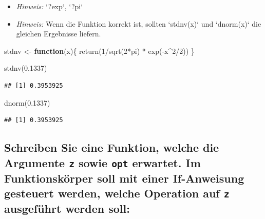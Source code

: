 \documentclass[12pt,a4paper]{article}
\newenvironment{Shaded}{\begin{snugshade}}{\end{snugshade}}
\newcommand{\ControlFlowTok}[1]{\textcolor[rgb]{0.13,0.29,0.53}{\textbf{#1}}}
\newcommand{\DecValTok}[1]{\textcolor[rgb]{0.00,0.00,0.81}{#1}}
\newcommand{\FloatTok}[1]{\textcolor[rgb]{0.00,0.00,0.81}{#1}}
\newcommand{\FunctionTok}[1]{\textcolor[rgb]{0.00,0.00,0.00}{#1}}
\newcommand{\NormalTok}[1]{#1}
\newcommand{\OtherTok}[1]{\textcolor[rgb]{0.56,0.35,0.01}{#1}}
\newcommand{\SpecialCharTok}[1]{\textcolor[rgb]{0.00,0.00,0.00}{#1}}
\begin{document}
\begin{itemize}
  \item \textit{Hinweis:} `?exp`, `?pi`
  \item \textit{Hinweis:} Wenn die Funktion korrekt ist, sollten `stdnv(x)` und `dnorm(x)` die gleichen Ergebnisse liefern.
\end{itemize}

\begin{Shaded}
\begin{Highlighting}[]
\NormalTok{    stdnv }\OtherTok{\textless{}{-}} \ControlFlowTok{function}\NormalTok{(x)\{}
      \FunctionTok{return}\NormalTok{(}\DecValTok{1}\SpecialCharTok{/}\FunctionTok{sqrt}\NormalTok{(}\DecValTok{2}\SpecialCharTok{*}\NormalTok{pi) }\SpecialCharTok{*} \FunctionTok{exp}\NormalTok{(}\SpecialCharTok{{-}}\NormalTok{x}\SpecialCharTok{\^{}}\DecValTok{2}\SpecialCharTok{/}\DecValTok{2}\NormalTok{))}
\NormalTok{    \}}
    
    \FunctionTok{stdnv}\NormalTok{(}\FloatTok{0.1337}\NormalTok{)}
\end{Highlighting}
\end{Shaded}

\begin{verbatim}
## [1] 0.3953925
\end{verbatim}

\begin{Shaded}
\begin{Highlighting}[]
    \FunctionTok{dnorm}\NormalTok{(}\FloatTok{0.1337}\NormalTok{)}
\end{Highlighting}
\end{Shaded}

\begin{verbatim}
## [1] 0.3953925
\end{verbatim}

\hypertarget{schreiben-sie-eine-funktion-welche-die-argumente-z-sowie-opt-erwartet.-im-funktionskuxf6rper-soll-mit-einer-if-anweisung-gesteuert-werden-welche-operation-auf-z-ausgefuxfchrt-werden-soll}{%
\subsection{\texorpdfstring{Schreiben Sie eine Funktion, welche die
Argumente \texttt{z} sowie \texttt{opt} erwartet. Im Funktionskörper
soll mit einer If-Anweisung gesteuert werden, welche Operation auf
\texttt{z} ausgeführt werden
soll:}{Schreiben Sie eine Funktion, welche die Argumente z sowie opt erwartet. Im Funktionskörper soll mit einer If-Anweisung gesteuert werden, welche Operation auf z ausgeführt werden soll:}}\label{schreiben-sie-eine-funktion-welche-die-argumente-z-sowie-opt-erwartet.-im-funktionskuxf6rper-soll-mit-einer-if-anweisung-gesteuert-werden-welche-operation-auf-z-ausgefuxfchrt-werden-soll}}
\end{document}
